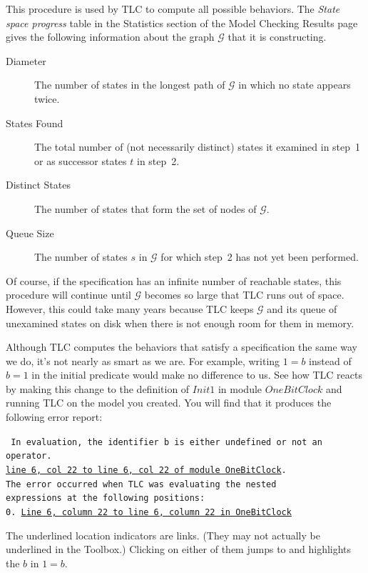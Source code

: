 \documentclass[fleqn,leqno]{article}
\begin{document}
\medskip

This procedure is used by TLC to compute all possible behaviors.  The
\emph{State space progress} table in the \textsf{Statistics} section
of the \textsf{Model Checking Results} page gives the following
information about the graph $\mathcal{G}$ that it is constructing.
\begin{description}
\item[Diameter] The number of states in the longest path of
                $\mathcal{G}$ in which no state appears twice.
\item[States Found] The total number of (not necessarily distinct)
states it examined in step~1 or as successor states $t$ in step~2.

\item[Distinct States] The number of states that form the set of nodes
of $\mathcal{G}$.

\item[Queue Size] The number of states $s$ in $\mathcal{G}$ for which
step~2 has not yet been performed.
\end{description}
Of course, if the specification has an infinite number of reachable
states, this procedure will continue until $\mathcal{G}$ becomes so
large that TLC runs out of space.  However, this could take many years
because TLC keeps $\mathcal{G}$ and its queue of unexamined states on
disk when there is not enough room for them in memory.

Although TLC computes the behaviors that satisfy a specification the
same way we do, it's not nearly as smart as we are.  For example,
writing $1=b$ instead of $b=1$ in the initial predicate would make no
difference to us.  See how TLC reacts by making this change to the
definition of $Init1$ in module $OneBitClock$ and running TLC on the
model you created.  You will find that it produces the following error
report:
\begin{widedisplay} \tt
In evaluation, the identifier b is either undefined or not an operator.\\
{\darkaqua\underline{line 6, col 22 to line 6, col 22 of module OneBitClock}}.\\
The error occurred when TLC was evaluating the nested\\
expressions at the following positions:\\
0. {\darkaqua\underline{Line 6, column 22 to line 6, column 22 in OneBitClock}}
\end{widedisplay}
The underlined location indicators are links.  (They may not actually be
underlined in the Toolbox.)  Clicking on either of them jumps
to and highlights the $b$ in $1=b$.
\end{document}

